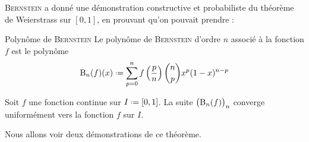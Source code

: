 \textsc{Bernstein} a donné une démonstration constructive et probabiliste du théorème de Weierstrass sur $[0, 1]$, en prouvant qu'on pouvait prendre : 

\begin{defi}{Polynôme de \textsc{Bernstein}}
    Le polynôme de \textsc{Bernstein} d'ordre $n$ associé à la fonction $f$ est le polynôme
    \begin{equation} \label{1}
        \Bernstein_n(f)(x) \defeq \sum_{p=0}^{n} f \left( \frac{p}{n} \right) \binom{n}{p} x^p (1-x)^{n-p}
    \end{equation}
\end{defi}

\begin{theo}{}
    Soit $f$ une fonction continue sur $I \defeq [0, 1]$. 
    La suite $\big( \mathrm{B}_n(f) \big)_n$ converge uniformément vers la fonction $f$ sur $I$.
\end{theo}

Nous allons voir deux démonstrations de ce théorème.

